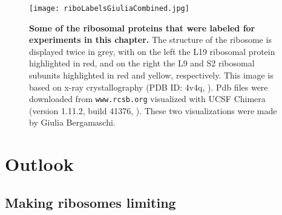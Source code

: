 \begin{figure}
    \centering
    \texttt{[image: riboLabelsGiuliaCombined.jpg]}
    \caption{ 
        \textbf{Some of the ribosomal proteins that were labeled for experiments in this chapter.}
        The structure of the ribosome is displayed twice in grey, with on the left the L19 ribosomal protein highlighted in red, and on the right the L9 and S2 ribosomal subunits highlighted in red and yellow, respectively.
        This image is based on x-ray crystallography (PDB ID: 4v4q, \cite{Schuwirth2005}). Pdb files were downloaded from \texttt{www.rcsb.org} \cite{Berman2000} 
        visualized with UCSF Chimera (version 1.11.2, build 41376, \cite{pettersen2004}). These two visualizations were made by Giulia Bergamaschi.
    }
    \label{fig:ribo:labelsPicGiulia}
\end{figure}

\section{Outlook}

\subsection{Making ribosomes limiting}



